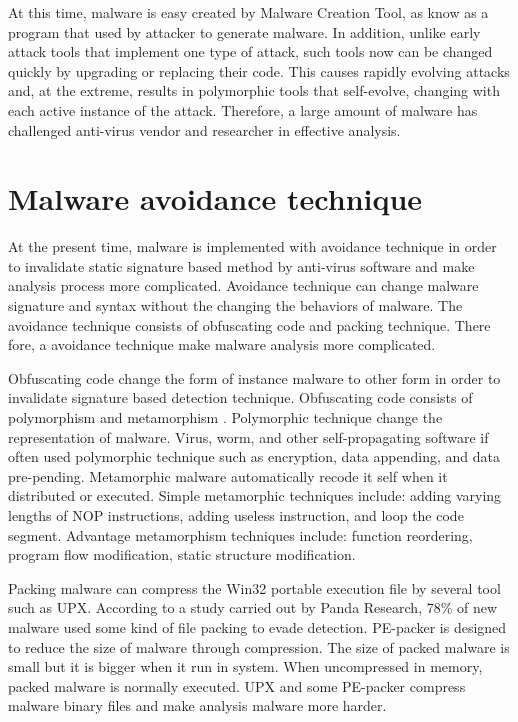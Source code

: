 At this time, malware is easy created by Malware Creation Tool, as know as a program that used by attacker to generate malware\cite{Microsoft}. In addition, unlike early attack tools that implement one type of attack, such tools now can be changed quickly by upgrading or replacing their code. This causes rapidly evolving attacks and, at the extreme, results in polymorphic tools that self-evolve, changing with each active instance of the attack. Therefore, a large amount of malware has challenged anti-virus vendor and researcher in effective analysis.

\section{Malware avoidance technique}

At the present time, malware is implemented with avoidance technique in order to invalidate static signature based method by anti-virus software and make analysis process more complicated. Avoidance technique can change malware signature and syntax without the changing the behaviors of malware. The avoidance technique consists of obfuscating code and packing technique. There fore, a avoidance technique make malware analysis more complicated. 
 
Obfuscating code change the form of instance malware to other form in order to invalidate signature based detection technique. Obfuscating code consists of polymorphism and metamorphism \cite{blackhat1}. Polymorphic technique change the representation of malware. Virus, worm, and other self-propagating software if often used polymorphic technique such as encryption, data appending, and data pre-pending.  Metamorphic malware automatically recode it self when it distributed or executed\cite{blackhat1}. Simple metamorphic techniques include: adding varying lengths of NOP instructions, adding useless instruction, and loop the code segment. Advantage metamorphism techniques include: function reordering, program flow modification, static structure modification.

Packing malware can compress the Win32 portable execution file by several tool such as UPX. According to a study carried out by Panda Research, 78\% of new malware used some kind of file packing to evade detection. PE-packer is designed to reduce the size of malware through compression. The size of packed malware is small but it is bigger when it run in system\cite{packing}. When uncompressed in memory, packed malware is normally executed. UPX and some PE-packer compress malware binary files and make analysis malware more harder.

